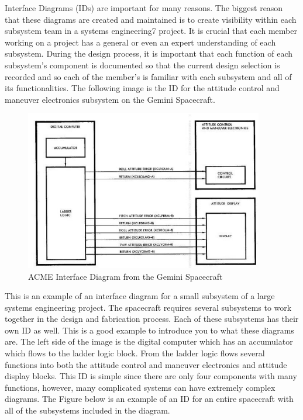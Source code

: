 \documentclass{article}
\begin{document}
Interface Diagrams (IDs) are important for many reasons. The biggest
reason that these diagrams are created and maintained is to create
visibility within each subsystem team in a systems engineering7
project. It is crucial that each member working on a project has a
general or even an expert understanding of each subsystem. During the
design process, it is important that each function of each subsystem’s
component is documented so that the current design selection is
recorded and so each of the member’s is familiar with each subsystem
and all of its functionalities. The following image is the ID for the
attitude control and maneuver electronics subsystem on the Gemini Spacecraft.  
\begin{figure}[H]
  \begin{center}
  \includegraphics[height=70mm]{Figures/ACME_ID}
  \end{center}
  \caption{ACME Interface Diagram from the Gemini Spacecraft\cite{qp10}}
\end{figure}
This is an example of an interface diagram for a small subsystem of a
large systems engineering project. The spacecraft requires several
subsystems to work together in the design and fabrication
process. Each of these subsystems has their own ID as well. This is a
good example to introduce you to what these diagrams are. The left
side of the image is the digital computer  which has an accumulator
which flows to the ladder logic block. From the ladder logic flows
several functions into both the attitude control and maneuver
electronics and attitude display blocks. This ID is simple since there
are only four components with many functions, however, many
complicated systems can have extremely complex diagrams. The Figure
below is an example of an ID for an entire spacecraft with all of the 
subsystems included in the diagram.
\end{document}
